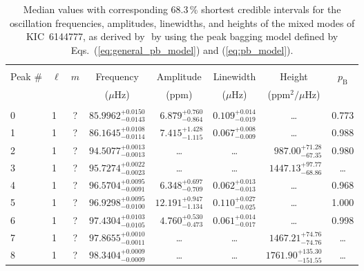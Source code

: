 \begin{table*}[!]
\caption{Median values with corresponding 68.3\,\% shortest credible intervals for the oscillation frequencies, amplitudes, linewidths, and heights of the mixed modes of KIC~6144777, as derived by \diamonds\,\,by using the peak bagging model defined by Eqs.~(\ref{eq:general_pb_model}) and (\ref{eq:pb_model}).}
\label{tab:6144777m}
\centering
\begin{tabular}{llcrrlrc}
\hline\hline
\\[-8pt]          
Peak \# & $\ell$ & $m$ & \multicolumn{1}{c}{Frequency} & \multicolumn{1}{c}{Amplitude} & \multicolumn{1}{c}{Linewidth} & \multicolumn{1}{c}{Height}& $p_\mathrm{B}$\\
 & & & \multicolumn{1}{c}{($\mu$Hz)} & \multicolumn{1}{c}{(ppm)} & \multicolumn{1}{c}{($\mu$Hz)} & \multicolumn{1}{c}{(ppm$^2/\mu$Hz)}\\
\hline \\[-8pt]
0 & 1 & ? & $     85.9962_{-      0.0143}^{+      0.0150}$ & $       6.879_{-       0.864}^{+       0.760}$ & $       0.109_{-       0.019}^{+       0.014}$ & \multicolumn{1}{c}{\dots} & 0.773\\[1pt]
1 & 1 & ? & $     86.1645_{-      0.0114}^{+      0.0108}$ & $       7.415_{-       1.115}^{+       1.428}$ & $       0.067_{-       0.009}^{+       0.008}$ & \multicolumn{1}{c}{\dots} & 0.988\\[1pt]

2 & 1 & ? & $     94.5077_{-      0.0013}^{+      0.0013}$ & \multicolumn{1}{c}{\dots} & \multicolumn{1}{c}{\dots} & $      987.00_{-       67.35}^{+       71.28}$ & 0.980\\[1pt]
3 & 1 & ? & $     95.7274_{-      0.0023}^{+      0.0022}$ & \multicolumn{1}{c}{\dots} & \multicolumn{1}{c}{\dots} & $     1447.13_{-       68.86}^{+       97.77}$ & \dots \\[1pt]
4 & 1 & ? & $     96.5704_{-      0.0091}^{+      0.0095}$ & $       6.348_{-       0.709}^{+       0.697}$ & $       0.062_{-       0.013}^{+       0.013}$ & \multicolumn{1}{c}{\dots} & 0.968\\[1pt]
5 & 1 & ? & $     96.9298_{-      0.0100}^{+      0.0095}$ & $      12.191_{-       1.134}^{+       0.947}$ & $       0.110_{-       0.025}^{+       0.027}$ & \multicolumn{1}{c}{\dots} & 1.000\\[1pt]
6 & 1 & ? & $     97.4304_{-      0.0105}^{+      0.0103}$ & $       4.760_{-       0.473}^{+       0.530}$ & $       0.061_{-       0.017}^{+       0.014}$ & \multicolumn{1}{c}{\dots} & 0.998\\[1pt]
7 & 1 & ? & $     97.8655_{-      0.0011}^{+      0.0010}$ & \multicolumn{1}{c}{\dots} & \multicolumn{1}{c}{\dots} & $     1467.21_{-       74.76}^{+       74.76}$ & \dots \\[1pt]
8 & 1 & ? & $     98.3404_{-      0.0009}^{+      0.0009}$ & \multicolumn{1}{c}{\dots} & \multicolumn{1}{c}{\dots} & $     1761.90_{-      151.55}^{+      135.30}$ & \dots \\[1pt]


\end{tabular}
\end{table*}
